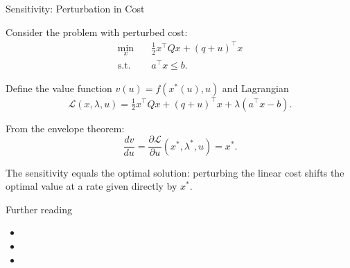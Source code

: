 \documentclass{beamer}
\begin{document}
\begin{frame}{Sensitivity: Perturbation in Cost}
	\begin{flushleft}
		
		Consider the problem with perturbed cost:
		\begin{equation*}
			\begin{aligned}
				\min_x \quad & \tfrac{1}{2} x^\top Q x + (q+u)^\top x \\
				\text{s.t.} \quad & a^\top x \le b.
			\end{aligned}
		\end{equation*}
		
		Define the value function $v(u) = f(x^*(u), u)$ and Lagrangian
		\begin{equation*}
			\mathcal{L}(x,\lambda,u) = \tfrac{1}{2} x^\top Q x + (q+u)^\top x + \lambda (a^\top x - b).
		\end{equation*}
		
		From the envelope theorem:
		\begin{equation*}
			\frac{dv}{du} = \frac{\partial \mathcal{L}}{\partial u}(x^*, \lambda^*, u) = x^*.
		\end{equation*}
		
		The sensitivity equals the optimal solution: perturbing the linear cost shifts the optimal value at a rate given directly by $x^*$.
		
	\end{flushleft}
\end{frame}






\begin{frame}{Further reading}
	\begin{flushleft}
		
		\begin{itemize}
			\item {}
			
			\item {}
			
			\item {}
		\end{itemize}
		
		
		
		
		
		
	\end{flushleft}
\end{frame}






\myqrframe
\end{document}
